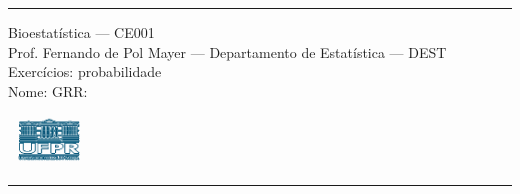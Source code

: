 \documentclass[a4paper,11pt,fleqn]{article}\usepackage[]{graphicx}\usepackage[]{color}
\theoremstyle{definition}
\begin{document}
\reversemarginpar %





\hrule
\vspace{0.3cm}

\begin{minipage}[c]{.85\textwidth}
  Bioestatística --- CE001 \\
  Prof. Fernando de Pol Mayer --- Departamento de Estatística --- DEST \\
  Exercícios: probabilidade \\
  Nome:   \hfill GRR: \hspace{2cm}
\end{minipage}\hfill
\begin{minipage}[c]{.15\textwidth}
\flushright
\includegraphics[width=2.2cm]{../img/ufpr-logo.png}
\end{minipage}

\vspace{0.3cm}
\hrule
\vspace{0.3cm}
\end{document}
